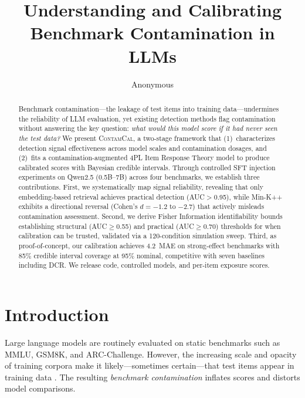 \documentclass[11pt,a4paper]{article}
\title{Understanding and Calibrating Benchmark Contamination in LLMs}
\author{Anonymous}
\newcommand{\contamcal}{\textsc{ContamCal}}
\newcommand{\pp}{\,\text{pp}}
\begin{document}
\maketitle

\begin{abstract}
Benchmark contamination---the leakage of test items into training data---undermines the reliability of LLM evaluation, yet existing detection methods flag contamination without answering the key question: \emph{what would this model score if it had never seen the test data?}
We present \contamcal{}, a two-stage framework that (1)~characterizes detection signal effectiveness across model scales and contamination dosages, and (2)~fits a contamination-augmented 4PL Item Response Theory model to produce calibrated scores with Bayesian credible intervals.
Through controlled SFT injection experiments on Qwen2.5 (0.5B--7B) across four benchmarks, we establish three contributions.
First, we systematically map signal reliability, revealing that only embedding-based retrieval achieves practical detection (AUC$>$0.95), while Min-K++ exhibits a directional reversal (Cohen's $d = -1.2$ to $-2.7$) that actively misleads contamination assessment.
Second, we derive Fisher Information identifiability bounds establishing structural (AUC$\geq$0.55) and practical (AUC$\geq$0.70) thresholds for when calibration can be trusted, validated via a 120-condition simulation sweep.
Third, as proof-of-concept, our calibration achieves 4.2\pp{} MAE on strong-effect benchmarks with 85\% credible interval coverage at 95\% nominal, competitive with seven baselines including DCR.
We release code, controlled models, and per-item exposure scores.
\end{abstract}

\section{Introduction}
\label{sec:intro}

Large language models are routinely evaluated on static benchmarks such as MMLU, GSM8K, and ARC-Challenge. However, the increasing scale and opacity of training corpora make it likely---sometimes certain---that test items appear in training data \citep{sainz2023chatgpt,li2024task}.
The resulting \emph{benchmark contamination} inflates scores and distorts model comparisons.
\end{document}
